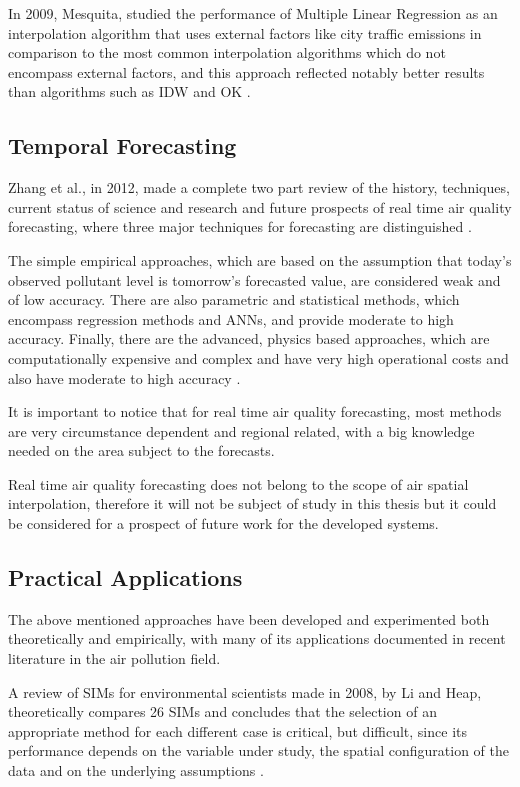 In 2009, Mesquita, studied the performance of Multiple Linear Regression as an interpolation algorithm that uses external factors like city traffic emissions in comparison to the most common interpolation algorithms which do not encompass external factors, and this approach reflected notably better results than algorithms such as IDW and OK \cite{Mesquita2009}.


\subsection{Temporal Forecasting}

Zhang et al., in 2012, made a complete two part review of the history, techniques, current status of science and research and future prospects of real time air quality forecasting, where three major techniques for forecasting are distinguished \cite{Zhang2012} \cite{Zhang2012a}.

The simple empirical approaches, which are based on the assumption that today’s observed pollutant level is tomorrow’s forecasted value, are considered weak and of low accuracy. There are also parametric and statistical methods, which encompass regression methods and ANNs, and provide moderate to high accuracy. Finally, there are the advanced, physics based approaches, which are computationally expensive and complex and have very high operational costs and also have moderate to high accuracy \cite{Zhang2012}.

It is important to notice that for real time air quality forecasting, most methods are very circumstance dependent and regional related, with a big knowledge needed on the area subject to the forecasts.

Real time air quality forecasting does not belong to the scope of air spatial interpolation, therefore it will not be subject of study in this thesis but it could be considered for a prospect of future work for the developed systems.


\subsection{Practical Applications}

The above mentioned approaches have been developed and experimented both theoretically and empirically, with many of its applications documented in recent literature in the air pollution field.

A review of SIMs for environmental scientists made in 2008, by Li and Heap, theoretically compares 26 SIMs and concludes that the selection of an appropriate method for each different case is critical, but difficult, since its performance depends on the variable under study, the spatial configuration of the data and on the underlying assumptions \cite{Li2008}.

